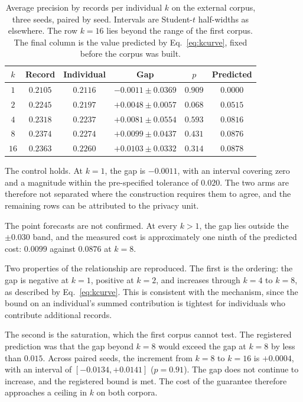 \begin{table}[!t]
\centering
\caption{Average precision by records per individual $k$ on the external
corpus, three seeds, paired by seed. Intervals are Student-$t$ half-widths as
elsewhere. The row $k = 16$ lies beyond the range of the first corpus. The final column is
the value predicted by Eq.~\eqref{eq:kcurve}, fixed before the corpus was
built.}
\label{tab:kscaling_eicu}
\setlength{\tabcolsep}{4pt}
\begin{tabular}{cccccc}
\toprule
$k$ & Record & Individual & Gap & $p$ & Predicted \\
\midrule
$1$ & $0.2105$ & $0.2116$ & $-0.0011 \pm 0.0369$ & $0.909$ & $0.0000$ \\
$2$ & $0.2245$ & $0.2197$ & $+0.0048 \pm 0.0057$ & $0.068$ & $0.0515$ \\
$4$ & $0.2318$ & $0.2237$ & $+0.0081 \pm 0.0554$ & $0.593$ & $0.0816$ \\
$8$ & $0.2374$ & $0.2274$ & $+0.0099 \pm 0.0437$ & $0.431$ & $0.0876$ \\
$16$ & $0.2363$ & $0.2260$ & $+0.0103 \pm 0.0332$ & $0.314$ & $0.0878$ \\
\bottomrule
\end{tabular}
\end{table}

The control holds. At $k = 1$, the gap is $-0.0011$, with an interval covering
zero and a magnitude within the pre-specified tolerance of $0.020$. The two arms
are therefore not separated where the construction requires them to agree, and
the remaining rows can be attributed to the privacy unit.

The point forecasts are not confirmed. At every $k > 1$, the gap lies outside
the $\pm 0.030$ band, and the measured cost is approximately one ninth of the
predicted cost: $0.0099$ against $0.0876$ at $k = 8$.

Two properties of the relationship are reproduced. The first is the ordering: the gap is
negative at $k = 1$, positive at $k = 2$, and increases through $k = 4$ to
$k = 8$, as described by Eq.~\eqref{eq:kcurve}. This is consistent with the
mechanism, since the bound on an individual's summed contribution is tightest
for individuals who contribute additional records.

The second is the saturation, which the first corpus cannot test. The
registered prediction was that the gap beyond $k = 8$ would exceed the gap at
$k = 8$ by less than $0.015$. Across paired seeds, the increment from $k = 8$ to
$k = 16$ is $+0.0004$, with an interval of $[-0.0134, +0.0141]$ ($p = 0.91$).
The gap does not continue to increase, and the registered bound is met. The
cost of the guarantee therefore approaches a ceiling in $k$ on both corpora.

